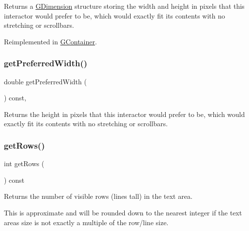 Returns a \mbox{\hyperlink{classGDimension}{G\+Dimension}} structure storing the width and height in pixels that this interactor would prefer to be, which would exactly fit its contents with no stretching or scrollbars. 



Reimplemented in \mbox{\hyperlink{classGContainer_a21904b305edacd8f871d6951cb8d3fa5}{G\+Container}}.

\mbox{\label{classGInteractor_a82bca31d37700fb0e35d2743352efd5e}} 
\subsubsection{\texorpdfstring{get\+Preferred\+Width()}{getPreferredWidth()}}
{\footnotesize\ttfamily double get\+Preferred\+Width (\begin{DoxyParamCaption}{ }\end{DoxyParamCaption}) const\hspace{0.3cm}{\ttfamily [virtual]}, {\ttfamily [inherited]}}



Returns the height in pixels that this interactor would prefer to be, which would exactly fit its contents with no stretching or scrollbars. 

\mbox{\label{classGTextArea_ad343f9bbb050d9037167e80e423ab4e8}} 
\subsubsection{\texorpdfstring{get\+Rows()}{getRows()}}
{\footnotesize\ttfamily int get\+Rows (\begin{DoxyParamCaption}{ }\end{DoxyParamCaption}) const\hspace{0.3cm}{\ttfamily [virtual]}}



Returns the number of visible rows (lines tall) in the text area. 

This is approximate and will be rounded down to the nearest integer if the text area\textquotesingle{}s size is not exactly a multiple of the row/line size. \mbox{\label{classGTextArea_a512371b3f41599349f23389825a6ccf7}} 
